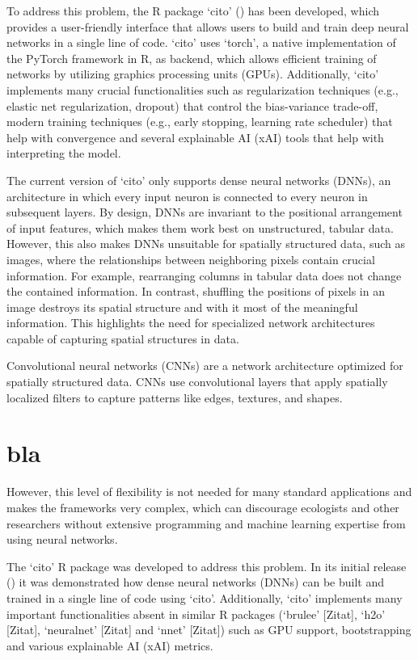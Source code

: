 \documentclass[12pt,twoside]{scrreport}
\newcommand{\pkg}[1]{`#1'}
\begin{document}
To address this problem, the R package \pkg{cito} (\cite{amesoderCitoPackageTraining2024}) has been developed, which provides a user-friendly interface that allows users to build and train deep neural networks in a single line of code. \pkg{cito} uses \pkg{torch}, a native implementation of the PyTorch framework in R, as backend, which allows efficient training of networks by utilizing graphics processing units (GPUs). Additionally, \pkg{cito} implements many crucial functionalities such as regularization techniques (e.g., elastic net regularization, dropout) that control the bias-variance trade-off, modern training techniques (e.g., early stopping, learning rate scheduler) that help with convergence and several explainable AI (xAI) tools that help with interpreting the model.

The current version of \pkg{cito} only supports dense neural networks (DNNs), an architecture in which every input neuron is connected to every neuron in subsequent layers. By design, DNNs are invariant to the positional arrangement of input features, which makes them work best on unstructured, tabular data. However, this also makes DNNs unsuitable for spatially structured data, such as images, where the relationships between neighboring pixels contain crucial information. For example, rearranging columns in tabular data does not change the contained information. In contrast, shuffling the positions of pixels in an image destroys its spatial structure and with it most of the meaningful information. This highlights the need for specialized network architectures capable of capturing spatial structures in data.

Convolutional neural networks (CNNs) are a network architecture optimized for spatially structured data. CNNs use convolutional layers that apply spatially localized filters to capture patterns like edges, textures, and shapes.




\section{bla}

However, this level of flexibility is not needed for many standard applications and makes the frameworks very complex, which can discourage ecologists and other researchers without extensive programming and machine learning expertise from using neural networks.

The \pkg{cito} R package was developed to address this problem. In its initial release (\cite{amesoderCitoPackageTraining2024}) it was demonstrated how dense neural networks (DNNs) can be built and trained in a single line of code using \pkg{cito}. Additionally, \pkg{cito} implements many important functionalities absent in similar R packages (\pkg{brulee} [Zitat], \pkg{h2o} [Zitat], \pkg{neuralnet} [Zitat] and \pkg{nnet} [Zitat]) such as GPU support, bootstrapping and various explainable AI (xAI) metrics.
\end{document}
